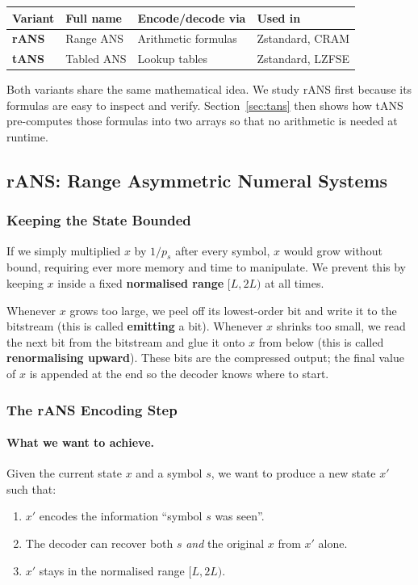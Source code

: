 \begin{center}
\begin{tabular}{@{}llll@{}}
\toprule
\textbf{Variant} & \textbf{Full name} & \textbf{Encode/decode via}
  & \textbf{Used in} \\
\midrule
\textbf{rANS} & Range ANS   & Arithmetic formulas & Zstandard, CRAM \\
\textbf{tANS} & Tabled  ANS & Lookup tables       & Zstandard, LZFSE \\
\bottomrule
\end{tabular}
\end{center}

Both variants share the same mathematical idea.  We study
rANS first because its formulas are easy to inspect and
verify.  Section~\ref{sec:tans} then shows how tANS
pre-computes those formulas into two arrays so that no
arithmetic is needed at runtime.

\subsection{rANS: Range Asymmetric Numeral Systems}

\subsubsection{Keeping the State Bounded}

If we simply multiplied $x$ by $1/p_s$ after every symbol,
$x$ would grow without bound, requiring ever more memory and
time to manipulate.  We prevent this by keeping $x$ inside a
fixed \textbf{normalised range} $[L, 2L)$ at all times.

Whenever $x$ grows too large, we peel off its lowest-order
bit and write it to the bitstream (this is called
\textbf{emitting} a bit).  Whenever $x$ shrinks too small,
we read the next bit from the bitstream and glue it onto $x$
from below (this is called \textbf{renormalising upward}).
These bits are the compressed output; the final value of $x$
is appended at the end so the decoder knows where to start.


\subsubsection{The rANS Encoding Step}
\label{sec:rans_encode}

\paragraph{What we want to achieve.}
Given the current state $x$ and a symbol $s$, we want to
produce a new state $x'$ such that:
\begin{enumerate}
  \item $x'$ encodes the information ``symbol $s$ was seen''.
  \item The decoder can recover both $s$ \emph{and} the
        original $x$ from $x'$ alone.
  \item $x'$ stays in the normalised range $[L, 2L)$.
\end{enumerate}

